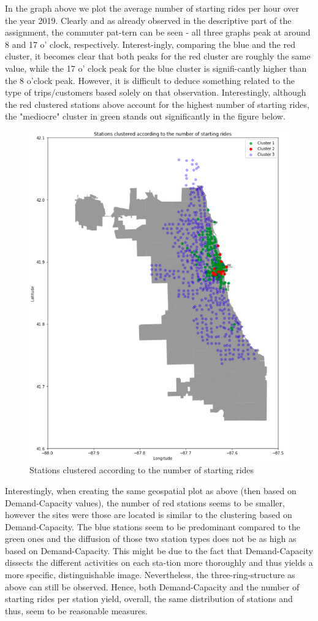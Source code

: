 In the graph above we plot the average number of starting rides per hour over the year 2019. Clearly and as already observed in the descriptive part of the assignment, the commuter pat-tern can be seen - all three graphs peak at around 8 and 17 o' clock, respectively. Interest-ingly, comparing the blue and the red cluster, it becomes clear that both peaks for the red cluster are roughly the same value, while the 17 o' clock peak for the blue cluster is signifi-cantly higher than the 8 o'clock peak. However, it is difficult to deduce something related to the type of trips/customers based solely on that observation. Interestingly, although the red clustered stations above account for the highest number of starting rides, the "mediocre" cluster in green stands out significantly in the figure below.

\begin{figure}[H]
   \centering
    \includegraphics[width=0.8\linewidth]{./Figures/BC_APP12.png}
    \caption{Stations clustered according to the number of starting rides}
    \label{BCAPP12}
\end{figure}

Interestingly, when creating the same geospatial plot as above (then based on Demand-Capacity values), the number of red stations seems to be smaller, however the sites were those are located is similar to the clustering based on Demand-Capacity. The blue stations seem to be predominant compared to the green ones and the diffusion of those two station types does not be as high as based on Demand-Capacity. This might be due to the fact that Demand-Capacity dissects the different activities on each sta-tion more thoroughly and thus yields a more specific, distinguishable image. Nevertheless, the three-ring-structure as above can still be observed. Hence, both Demand-Capacity and the number of starting rides per station yield, overall, the same distribution of stations and thus, seem to be reasonable measures.

